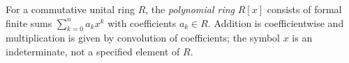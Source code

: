 
For a commutative unital ring $R$, the \emph{polynomial ring} $R[x]$ consists of formal finite sums $\sum_{k=0}^n a_kx^k$ with coefficients $a_k\in R$. Addition is coefficientwise and multiplication is given by convolution of coefficients; the symbol $x$ is an indeterminate, not a specified element of $R$.
